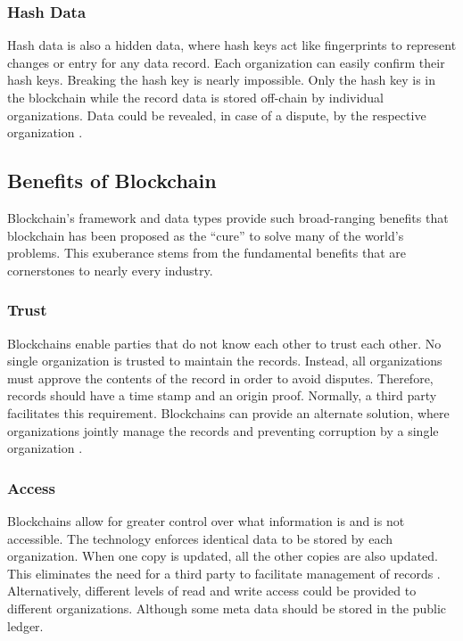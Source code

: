 \documentclass[sigconf]{acmart}
\begin{document}
\subsubsection{Hash Data} Hash data is also a hidden data, where hash keys act like fingerprints to represent changes or entry for any data record. Each organization can easily confirm their hash keys. Breaking the hash key is nearly impossible. Only the hash key is in the blockchain while the record data is stored off-chain by individual organizations. Data could be revealed, in case of a dispute, by the respective organization \cite{arbc1}.

\subsection{Benefits of Blockchain}
Blockchain's framework and data types provide such broad-ranging benefits that blockchain has been proposed as the ``cure'' to solve many of the world's problems. This exuberance stems from the fundamental benefits that are cornerstones to nearly every industry.

\subsubsection{Trust} Blockchains enable parties that do not know each other to trust each other. No single organization is trusted to maintain the records. Instead, all organizations must approve the contents of the record in order to avoid disputes. Therefore, records should have a time stamp and an origin proof. Normally, a third party facilitates this requirement. Blockchains can provide an alternate solution, where organizations jointly manage the records and preventing corruption by a single organization \cite{arbc1}. 

\subsubsection{Access} Blockchains allow for greater control over what information is and is not accessible. The technology enforces identical data to be stored by each organization. When one copy is updated, all the other copies are also updated. This eliminates the need for a third party to facilitate management of records \cite{arbc3}. Alternatively, different levels of read and write access could be provided to different organizations. Although some meta data should be stored in the public ledger. 
\end{document}
